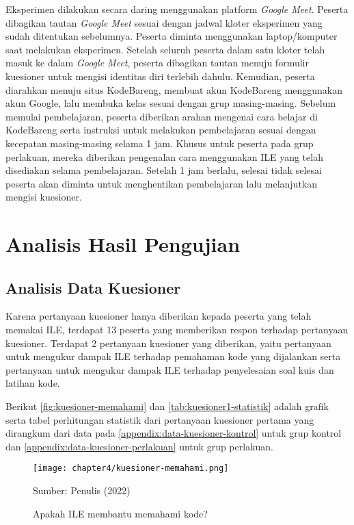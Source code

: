 Eksperimen dilakukan secara daring menggunakan platform \textit{Google Meet}. Peserta dibagikan tautan \textit{Google Meet} sesuai dengan jadwal kloter eksperimen yang sudah ditentukan sebelumnya. Peserta diminta menggunakan laptop/komputer saat melakukan eksperimen. Setelah seluruh peserta dalam satu kloter telah masuk ke dalam \textit{Google Meet}, peserta dibagikan tautan menuju formulir kuesioner untuk mengisi identitas diri terlebih dahulu. Kemudian, peserta diarahkan menuju situs KodeBareng, membuat akun KodeBareng menggunakan akun Google, lalu membuka kelas sesuai dengan grup masing-masing. Sebelum memulai pembelajaran, peserta diberikan arahan mengenai cara belajar di KodeBareng serta instruksi untuk melakukan pembelajaran sesuai dengan kecepatan masing-masing selama 1 jam. Khusus untuk peserta pada grup perlakuan, mereka diberikan pengenalan cara menggunakan ILE yang telah disediakan selama pembelajaran. Setelah 1 jam berlalu, selesai tidak selesai peserta akan diminta untuk menghentikan pembelajaran lalu melanjutkan mengisi kuesioner.

\section{Analisis Hasil Pengujian} \label{sec:analisis-hasil-pengujian}

\subsection{Analisis Data Kuesioner}
Karena pertanyaan kuesioner hanya diberikan kepada peserta yang telah memakai ILE, terdapat 13 peserta yang memberikan respon terhadap pertanyaan kuesioner. Terdapat 2 pertanyaan kuesioner yang diberikan, yaitu pertanyaan untuk mengukur dampak ILE terhadap pemahaman kode yang dijalankan serta pertanyaan untuk mengukur dampak ILE terhadap penyelesaian soal kuis dan latihan kode.

Berikut \autoref{fig:kuesioner-memahami} dan \autoref{tab:kuesioner1-statistik} adalah grafik serta tabel perhitungan statistik dari pertanyaan kuesioner pertama yang dirangkum dari data pada \autoref{appendix:data-kuesioner-kontrol} untuk grup kontrol dan \autoref{appendix:data-kuesioner-perlakuan} untuk grup perlakuan.

\begin{figure}[H]
  \centering
  \texttt{[image: chapter4/kuesioner-memahami.png]}
  \caption{Apakah ILE membantu memahami kode?} \label{fig:kuesioner-memahami}
  Sumber: Penulis (2022)
\end{figure}

